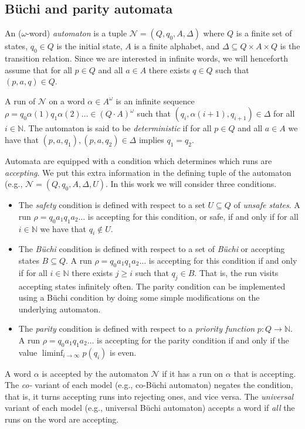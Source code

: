 \documentclass[runningheads,a4paper,draft]{llncs}
\newcommand{\calN}{\mathcal{N}}
\begin{document}
\subsection{B\"uchi and parity automata}
\begin{definition}
  An ($\omega$-word) \emph{automaton} is a tuple $\calN =
  (Q,q_0,A,\Delta)$ where $Q$ is a finite set of states, $q_0 \in Q$ is the
  initial state, $A$ is a finite alphabet, and $\Delta \subseteq Q \times A
  \times Q$ is the transition relation. Since we are interested in infinite
  words, we will henceforth assume that for all $p \in Q$ and all $a \in A$
  there exists $q \in Q$ such that $(p,a,q) \in Q$.
\end{definition}
A run of $\calN$ on a word $\alpha \in A^\omega$ is an infinite sequence $\rho =
q_0 \alpha(1) q_1 \alpha(2) \dots \in (Q\cdot A)^\omega$ such that
$(q_i,\alpha(i+1),q_{i+1}) \in \Delta$ for all $i \in \mathbb{N}$. The automaton
is said to be \emph{deterministic} if for all $p \in Q$ and all $a \in A$ we
have that $(p,a,q_1), (p,a,q_2) \in \Delta$ implies $q_1 = q_2$.

Automata are equipped with a condition which determines which runs are
\emph{accepting}.  We put this extra information in the defining tuple of the
automaton (e.g., \(\calN = (Q, q_0, A, \Delta, U)\).  In this work we will
consider three conditions.
\begin{itemize}
  \item The \emph{safety} condition is defined with respect to a set $U
    \subseteq Q$ of \emph{unsafe states}. A run $\rho = q_0 a_1 q_1 a_2 \dots$
    is accepting for this condition, or safe, if and only if for all $i \in
    \mathbb{N}$ we have that $q_i \not\in U$.
  \item The \emph{B\"uchi} condition is defined with respect to a set of
    \emph{B\"uchi} or accepting states $B \subseteq Q$. A run $\rho = q_0
    a_1 q_1 a_2 \dots$ is accepting for this condition if and only if for
    all $i \in \mathbb{N}$ there exists $j \ge i$ such that $q_j \in B$.
    That is, the run visits accepting states infinitely often.  The parity
    condition can be implemented using a Büchi condition by doing some simple
    modifications on the underlying automaton.
  \item The \emph{parity} condition is defined with respect to a
    \emph{priority function} $p\colon Q \to \mathbb{N}$. A run $\rho = q_0 a_1
    q_1 a_2 \dots$ is accepting for the parity condition if and only if the
    value $\liminf_{i \to \infty} p(q_i)$ is even.
\end{itemize}
A word $\alpha$ is accepted by the automaton $\calN$ if it has a run on $\alpha$
that is accepting.  The \emph{co-} variant of each model (e.g., co-Büchi
automaton) negates the condition, that is, it turns accepting runs into
rejecting ones, and vice versa.  The \emph{universal} variant
of each model (e.g., universal Büchi automaton) accepts a word if \emph{all} the
runs on the word are accepting.
\end{document}
